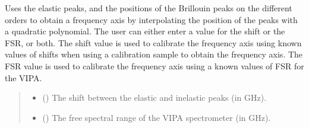 \documentclass[letterpaper,10pt,english]{sphinxmanual}
\begin{document}
\begin{fulllineitems}
\begin{fulllineitems}
\begin{quote}
\begin{description}
\end{description}\end{quote}

\end{fulllineitems}


\begin{fulllineitems}
\label{\detokenize{source/_autosummary/HDF5_BLS_analyse.Analyse_VIPA:HDF5_BLS_analyse.Analyse_VIPA.interpolate_elastic_inelastic}}
\pysigstartsignatures
\pysiglinewithargsret
{}
{\sphinxparamcomma {}}
{}
\pysigstopsignatures
\sphinxAtStartPar
Uses the elastic peaks, and the positions of the Brillouin peaks on the different orders to obtain a frequency axis by interpolating the position of the peaks with a quadratic polynomial. The user can either enter a value for the shift or the FSR, or both. The shift value is used to calibrate the frequency axis using known values of shifts when using a calibration sample to obtain the frequency axis. The FSR value is used to calibrate the frequency axis using a known values of FSR for the VIPA.
\begin{quote}\begin{description}
\begin{itemize}
\item {} 
\sphinxAtStartPar
{} () \textendash{} The shift between the elastic and inelastic peaks (in GHz).

\item {} 
\sphinxAtStartPar
{} () \textendash{} The free spectral range of the VIPA spectrometer (in GHz).

\end{itemize}

\end{description}\end{quote}


\end{fulllineitems}
\end{fulllineitems}
\end{document}
